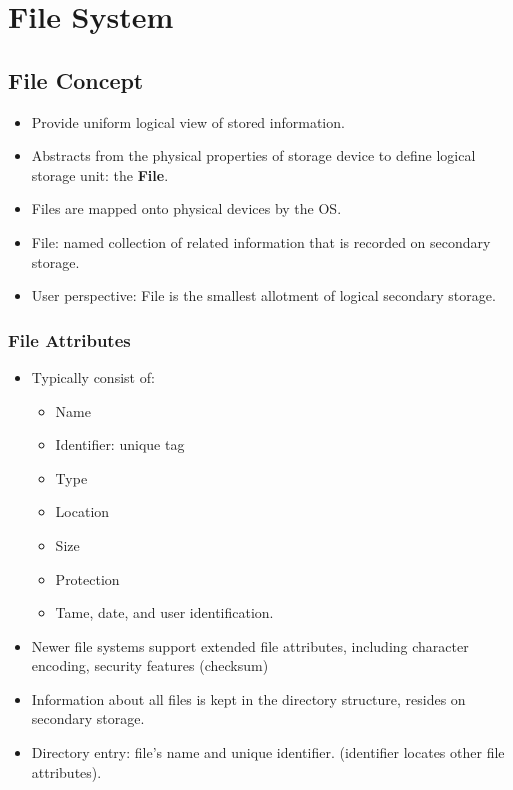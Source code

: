 \documentclass[10pt]{report}
\begin{document}
\chapter{File System} \label{ch:Chapter10}
	\section{File Concept}
		\begin{itemize}
			\item Provide uniform logical view of stored information.
			\item Abstracts from the physical properties of storage device to define logical storage unit: the \textbf{File}.
			\item Files are mapped onto physical devices by the OS.
			\item File: named collection of related information that is recorded on secondary storage.
			\item User perspective: File is the smallest allotment of logical secondary storage.
		\end{itemize}

		\subsection{File Attributes}
			\begin{itemize}
				\item Typically consist of:
				\begin{itemize}
						\item Name
						\item Identifier: unique tag
						\item Type
						\item Location
						\item Size
						\item Protection
						\item Tame, date, and user identification.
				\end{itemize}
				\item Newer file systems support extended file attributes, including character encoding, security features (checksum)
				\item Information about all files is kept in the directory structure, resides on secondary storage.
				\item Directory entry: file's name and unique identifier. (identifier locates other file attributes).
			\end{itemize}
\end{document}
